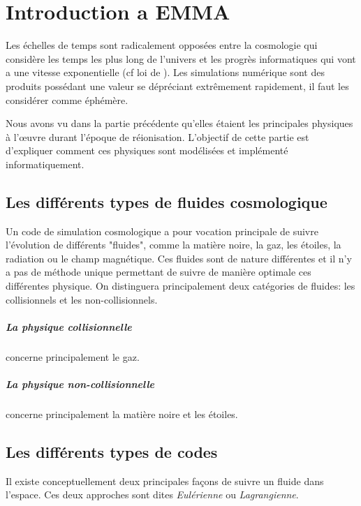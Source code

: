 \chapter{Introduction a EMMA}\label{ch:introduction}
Les échelles de temps sont radicalement opposées entre la cosmologie qui considère les temps les plus long de l'univers et les progrès informatiques qui vont a une vitesse exponentielle (cf loi de \cite{moore1965cramming}). %
Les simulations numérique sont des produits possédant une valeur se dépréciant extrêmement rapidement, il faut les considérer comme éphémère.



Nous avons vu dans la partie précédente qu'elles étaient les principales physiques à l’œuvre durant l'époque de réionisation.
L'objectif de cette partie est d'expliquer comment ces physiques sont modélisées et implémenté informatiquement.


\section{Les différents types de fluides cosmologique}

Un code de simulation cosmologique a pour vocation principale de suivre l'évolution de différents "fluides", comme la matière noire, la gaz, les étoiles, la radiation ou le champ magnétique.
Ces fluides sont de nature différentes et il n'y a pas de méthode unique permettant de suivre de manière optimale ces différentes physique.
On distinguera principalement deux catégories de fluides: les collisionnels et les non-collisionnels.

\paragraph{La physique collisionnelle} concerne principalement le gaz.
\paragraph{La physique non-collisionnelle} concerne principalement la matière noire et les étoiles.




\section{Les différents types de codes}

Il existe conceptuellement deux principales façons de suivre un fluide dans l'espace.
Ces deux approches sont dites \emph{Eulérienne} ou \emph{Lagrangienne}.

